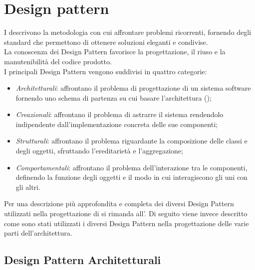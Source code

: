 \section{Design pattern}
I  descrivono la metodologia con cui affrontare problemi ricorrenti, fornendo degli standard che permettono di ottenere soluzioni eleganti e condivise.\\
La conoscenza dei Design Pattern favorisce la progettazione, il riuso e la manutenibilità del codice prodotto.\\
I principali Design Pattern vengono suddivisi in quattro categorie:
\begin{itemize}
	\item \textit{Architetturali}: affrontano il problema di progettazione di un sistema software fornendo uno schema di partenza su cui basare l'architettura ();
	\item \textit{Creazionali}: affrontano il problema di astrarre il sistema rendendolo indipendente dall'implementazione concreta delle sue componenti;
	\item \textit{Strutturali}: affrontano il problema riguardante la composizione delle classi e degli oggetti, sfruttando l'ereditarietà e l'aggregazione;
	\item \textit{Comportamentali}: affrontano il problema dell'interazione tra le componenti, definendo la funzione degli oggetti e il modo in cui interagiscono gli uni con gli altri.
\end{itemize}
Per una descrizione più approfondita e completa dei diversi Design Pattern utilizzati nella progettazione di \ProjectName{} si rimanda all'. Di seguito viene invece descritto come sono stati utilizzati i diversi Design Pattern nella progettazione delle varie parti dell'architettura.

\subsection{Design Pattern Architetturali}

